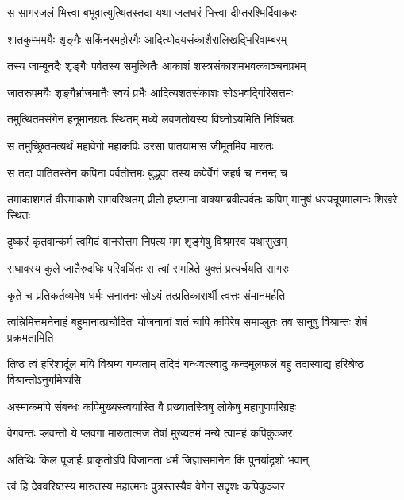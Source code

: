 \twolineshloka
{स सागरजलं भित्त्वा बभूवात्युत्थितस्तदा}
{यथा जलधरं भित्त्वा दीप्तरश्मिर्दिवाकरः} %

\twolineshloka
{शातकुम्भमयैः शृङ्गैः सकिंनरमहोरगैः}
{आदित्योदयसंकाशैरालिखद्भिरिवाम्बरम्} %

\twolineshloka
{तस्य जाम्बूनदैः शृङ्गैः पर्वतस्य समुत्थितैः}
{आकाशं शस्त्रसंकाशमभवत्काञ्चनप्रभम्} %

\twolineshloka
{जातरूपमयैः शृङ्गैर्भ्राजमानैः स्वयं प्रभैः}
{आदित्यशतसंकाशः सोऽभवद्गिरिसत्तमः} %

\twolineshloka
{तमुत्थितमसंगेन हनूमानग्रतः स्थितम्}
{मध्ये लवणतोयस्य विघ्नोऽयमिति निश्चितः} %

\twolineshloka
{स तमुच्छ्रितमत्यर्थं महावेगो महाकपिः}
{उरसा पातयामास जीमूतमिव मारुतः} %

\twolineshloka
{स तदा पातितस्तेन कपिना पर्वतोत्तमः}
{बुद्ध्वा तस्य कपेर्वेगं जहर्ष च ननन्द च} %

\threelineshloka
{तमाकाशगतं वीरमाकाशे समवस्थितम्}
{प्रीतो हृष्टमना वाक्यमब्रवीत्पर्वतः कपिम्}
{मानुषं धरयन्रूपमात्मनः शिखरे स्थितः} %

\twolineshloka
{दुष्करं कृतवान्कर्म त्वमिदं वानरोत्तम}
{निपत्य मम शृङ्गेषु विश्रमस्व यथासुखम्} %

\twolineshloka
{राघावस्य कुले जातैरुदधिः परिवर्धितः}
{स त्वां रामहिते युक्तं प्रत्यर्चयति सागरः} %

\twolineshloka
{कृते च प्रतिकर्तव्यमेष धर्मः सनातनः}
{सोऽयं तत्प्रतिकारार्थी त्वत्तः संमानमर्हति} %

\threelineshloka
{त्वन्निमित्तमनेनाहं बहुमानात्प्रचोदितः}
{योजनानां शतं चापि कपिरेष समाप्लुतः}
{तव सानुषु विश्रान्तः शेषं प्रक्रमतामिति} %

\threelineshloka
{तिष्ठ त्वं हरिशार्दूल मयि विश्रम्य गम्यताम्}
{तदिदं गन्धवत्स्वादु कन्दमूलफलं बहु}
{तदास्वाद्य हरिश्रेष्ठ विश्रान्तोऽनुगमिष्यसि} %

\twolineshloka
{अस्माकमपि संबन्धः कपिमुख्यस्त्वयास्ति वै}
{प्रख्यातस्त्रिषु लोकेषु महागुणपरिग्रहः} %

\twolineshloka
{वेगवन्तः प्लवन्तो ये प्लवगा मारुतात्मज}
{तेषां मुख्यतमं मन्ये त्वामहं कपिकुञ्जर} %

\twolineshloka
{अतिथिः किल पूजार्हः प्राकृतोऽपि विजानता}
{धर्मं जिज्ञासमानेन किं पुनर्यादृशो भवान्} %

\twolineshloka
{त्वं हि देववरिष्ठस्य मारुतस्य महात्मनः}
{पुत्रस्तस्यैव वेगेन सदृशः कपिकुञ्जर} %

